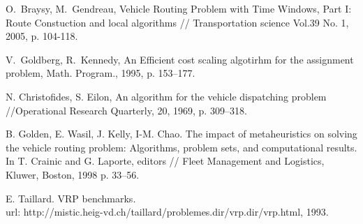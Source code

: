 \documentclass[]{TAACpaper}
\begin{document}
\begin{thebibliography}{99}
 O.~Braysy, M.~Gendreau, Vehicle Routing Problem with Time Windows, Part I: Route Constuction and local algorithms // Transportation science Vol.39 No. 1, 2005, p. 104-118.

 V.~Goldberg, R.~Kennedy, An Efficient cost scaling algotirhm for the assignment problem, Math. Program., 1995, p. 153--177.  

  N. Christofides, S. Eilon, An algorithm for the vehicle dispatching problem //Operational Research Quarterly, 20, 1969, p. 309–318.

  B. Golden, E. Wasil, J. Kelly, I-M. Chao. The impact of metaheuristics on solving the vehicle routing problem: Algorithms, problem sets, and computational results. In T. Crainic and G. Laporte, editors // Fleet Management and Logistics, Kluwer, Boston, 1998 p. 33–56.

  E. Taillard. VRP benchmarks.\\ url: http://mistic.heig-vd.ch/taillard/problemes.dir/vrp.dir/vrp.html, 1993.




\end{thebibliography}
\end{document}
